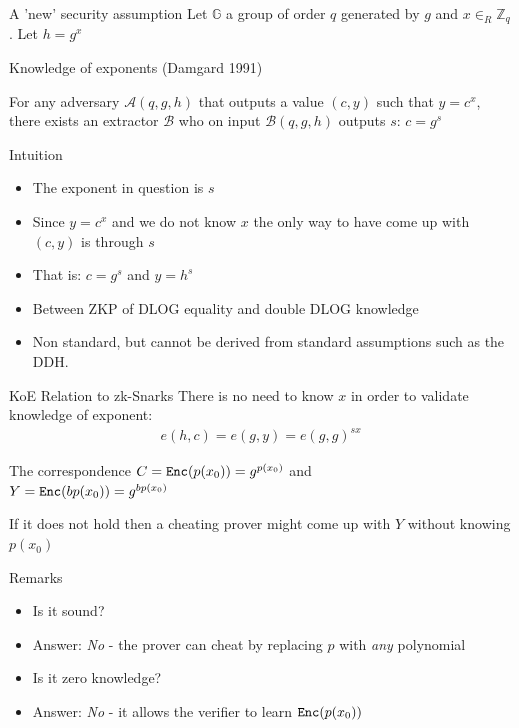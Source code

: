 \documentclass[handouts]{beamer}
\begin{document}
\begin{frame}[allowframebreaks]{A 'new' security assumption}
    Let $\mathbb{G}$ a group of order $q$ generated by $g$ and $x \in_R \mathbb{Z}_q$. Let $h = g^x$
    \begin{block}{Knowledge of exponents (Damgard 1991)} 
    
    For any adversary $\mathcal{A}(q,g,h)$ that outputs a value $(c,y)$ such that $y=c^x$,
    there exists an extractor $\mathcal{B}$ who on input $\mathcal{B}(q,g,h)$ 
    outputs $s$: $c=g^s$
    \end{block}
    \framebreak
    \begin{block}{Intuition}
        \begin{itemize}
            \item The exponent in question is $s$  
            \item Since $y=c^x$ and we do not know $x$ the only way to have come up with $(c,y)$ is  
                  through $s$
            \item That is: $c=g^s$ and $y=h^s$  
            \item Between ZKP of DLOG equality and double DLOG knowledge  
            \item Non standard, but cannot be derived from standard assumptions such as the DDH.  
        \end{itemize}
    \end{block}   
\end{frame}

\begin{frame}{KoE Relation to zk-Snarks}
There is no need to know $x$ in order to validate knowledge of exponent:
\begin{align*}
e(h,c) = e(g,y) = e(g,g)^{sx}
\end{align*}
\pause
\begin{block}{The correspondence}
$C=\mathtt{Enc}(p(x_0))=g^{p(x_0)}$ and \\
$Y=\mathtt{Enc}(bp(x_0))=g^{bp(x_0)}$
\end{block}
If it does not hold then a cheating prover might come up with $Y$ without knowing $p(x_0)$
\end{frame}

\begin{frame}{Remarks}
    \begin{itemize}
        \item Is it sound?
        \pause
        \item Answer: \emph{No} - the prover can cheat by replacing $p$ with \emph{any} polynomial
        \pause
        \item Is it zero knowledge?
        \pause
        \item Answer: \emph{No} - it allows the verifier to learn $\mathtt{Enc}(p(x_0))$
    \end{itemize}
\end{frame}
\end{document}
